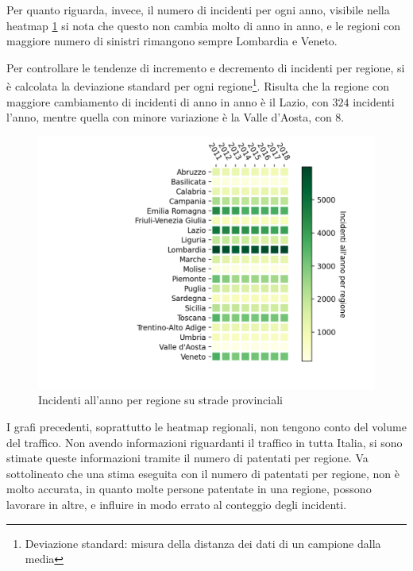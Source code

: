\documentclass[a4paper,12pt]{report}
\begin{document}
Per quanto riguarda, invece, il numero di incidenti per ogni anno, 
visibile nella heatmap \ref{fig:regione-heatmap} 
si nota che questo non cambia molto di anno in anno, e le regioni con maggiore numero 
di sinistri rimangono sempre Lombardia e Veneto.

Per controllare le tendenze di incremento e decremento di incidenti per regione, 
si è calcolata la deviazione standard per ogni regione\footnote{Deviazione standard: 
misura della distanza dei dati di un campione dalla media\cite{PROB_E_STATISTICA:2}}.
Risulta che la regione con maggiore cambiamento di incidenti di anno in anno 
è il Lazio, con $324$ incidenti l'anno, mentre quella con minore 
variazione è la Valle d'Aosta, con $8$.

\begin{figure}
    \includegraphics[width=\linewidth]{../src/incidenti/incidenti_aci/mappe_regioni/regioni_heatmap.png}
    \caption{Incidenti all'anno per regione su strade provinciali}
    \label{fig:regione-heatmap}
\end{figure}

I grafi precedenti, soprattutto le heatmap regionali, non tengono conto del 
volume del traffico.
Non avendo informazioni riguardanti il traffico in tutta Italia, si sono stimate 
queste informazioni tramite il numero di patentati per regione.
Va sottolineato che una stima eseguita con il numero di patentati per regione, 
non è molto accurata, in quanto molte persone patentate in una regione, possono 
lavorare in altre, e influire in modo errato al conteggio degli incidenti. 
\end{document}
